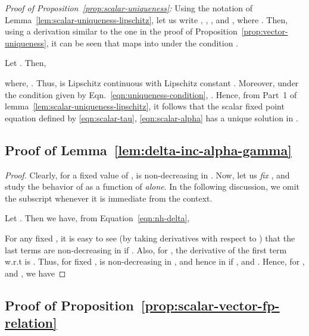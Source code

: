 \documentclass[12pt, draftclsnofoot, onecolumn]{IEEEtran}
\newcommand{\gap}{\vspace{2mm}}
\begin{document}
\gap
\noindent
\textit{Proof of Proposition~\ref{prop:scalar-uniqueness}:}
Using the notation of Lemma~\ref{lem:scalar-uniqueness-lipschitz}, let us write , , , and , where . Then, using a derivation similar to the one in the proof of Proposition~\ref{prop:vector-uniqueness}, it can be seen that  maps  into  under the condition .

Let . Then,

  
where, . Thus,  is Lipschitz continuous with Lipschitz constant . Moreover, under the condition given by Eqn.~\ref{eqn:uniqueness-condition}, . Hence, from Part~1 of lemma~\ref{lem:scalar-uniqueness-lipschitz}, it follows that the scalar fixed point equation defined by \eqref{eqn:scalar-tau}, \eqref{eqn:scalar-alpha} has a unique solution in .

\subsection{Proof of Lemma~\ref{lem:delta-inc-alpha-gamma}}
\label{subsec:proof-delta}
\begin{proof}
Clearly, for a fixed value of ,  is non-decreasing in . Now, let us \emph{fix} , and study the behavior of  as a function of  \emph{alone}. In the following discussion, we omit the subscript  whenever it is immediate from the context.

Let . Then we have, from Equation~\eqref{eqn:nh-delta},

For any fixed , it is easy to see (by taking derivatives with respect to ) that the last  terms are non-decreasing in  if . Also, for , the derivative of the first term w.r.t  is . Thus, for fixed ,  is non-decreasing in , and hence in  if , and . Hence, for , and , we have

\end{proof}

\subsection{Proof of Proposition~\ref{prop:scalar-vector-fp-relation}}
\label{subsec:proof-scalar-vector}
\end{document}
